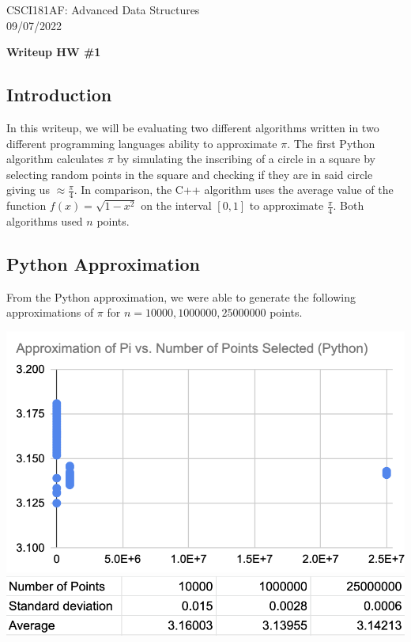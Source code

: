 \documentclass[11pt]{article}
\begin{document}
CSCI181AF: Advanced Data Structures\\
09/07/2022
\begin{center}
    \bf{Writeup HW \#1}
\end{center}
\subsection{Introduction}
In this writeup, we will be evaluating two different algorithms written in two different programming languages ability to approximate $\pi$. The first Python algorithm calculates $\pi$ by simulating the inscribing of a circle in a square by selecting random points in the square and checking if they are in said circle giving us $\approx \frac{\pi}{4}$. In comparison, the C++ algorithm uses the average value of the function $f(x) = \sqrt{1-x^2}$ on the interval $[0,1]$ to approximate $\frac{\pi}{4}$. Both algorithms used $n$ points.
\subsection{Python Approximation}
From the Python approximation, we were able to generate the following approximations of $\pi$ for $n = 10000, 1000000, 25000000$ points.
\begin{center}
    \includegraphics[scale = 0.4]{hw1image1.png} \includegraphics[scale = 0.4]{hw1image3.png}
\end{center}
\end{document}

